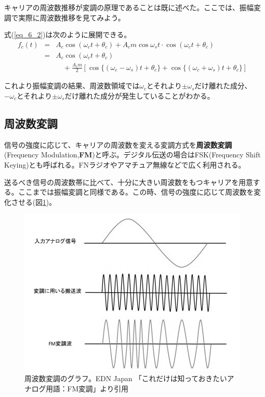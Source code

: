 キャリアの周波数推移が変調の原理であることは既に述べた。ここでは、振幅変調で実際に周波数推移を見てみよう。

式(\ref{eq_6_2})は次のように展開できる。
\begin{eqnarray}
f_c(t)&=&A_c\cos(\omega_ct+\theta_c)+A_cm\cos\omega_st\cdot\cos(\omega_ct+\theta_c) \nonumber \\
&=&A_c\cos(\omega_ct+\theta_c)\nonumber \\
&\ &\quad +\frac{A_cm}{2}\left[\cos\{(\omega_c-\omega_s)t+\theta_c\}+\cos\{(\omega_c+\omega_s)t+\theta_c\}\right] \label{eq_6_3}
\end{eqnarray}

これより振幅変調の結果、周波数領域では$\omega_c$とそれより$\pm\omega_s$だけ離れた成分、$-\omega_c$とそれより$\pm\omega_s$だけ離れた成分が発生していることがわかる。

\subsection{周波数変調}
信号の強度に応じて、キャリアの周波数を変える変調方式を\textbf{周波数変調}(Frequency Modulation,\textbf{FM})と呼ぶ。デジタル伝送の場合はFSK(Frequency Shift Keying)とも呼ばれる。FNラジオやアマチュア無線などで広く利用される。

送るべき信号の周波数帯に比べて、十分に大きい周波数をもつキャリアを用意する。ここまでは振幅変調と同様である。この時、信号の強度に応じて周波数を変化させる(図\ref{fig6_3})。

\begin{figure}[htb]
\centering
\includegraphics[width=0.8\linewidth,keepaspectratio,bb=0 0 422 307]{fig/fig6_3.jpg}
\caption{周波数変調のグラフ。EDN Japan 「これだけは知っておきたいアナログ用語：FM変調」より引用}\label{fig6_3}
\end{figure}

